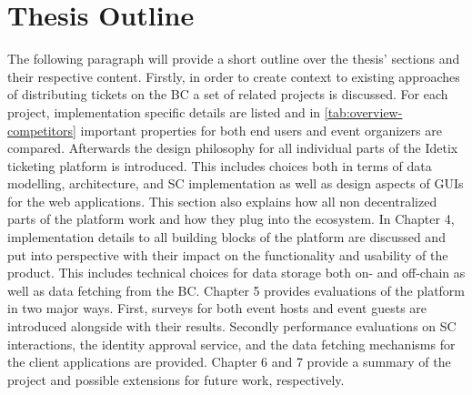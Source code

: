\section{Thesis Outline}

The following paragraph will provide a short outline over the thesis' sections and their respective content. Firstly, in order to create context to existing approaches of distributing tickets on the BC a set of related projects is discussed. For each project, implementation specific details are listed and in \ref{tab:overview-competitors} important properties for both end users and event organizers are compared. Afterwards the design philosophy for all individual parts of the Idetix ticketing platform is introduced. This includes choices both in terms of data modelling, architecture, and SC implementation as well as design aspects of GUIs for the web applications. This section also explains how all non decentralized parts of the platform work and how they plug into the ecosystem. In Chapter 4, implementation details to all building blocks of the platform are discussed and put into perspective with their impact on the functionality and usability of the product. This includes technical choices for data storage both on- and off-chain as well as data fetching from the BC. Chapter 5 provides evaluations of the platform in two major ways. First, surveys for both event hosts and event guests are introduced alongside with their results. Secondly performance evaluations on SC interactions, the identity approval service, and the data fetching mechanisms for the client applications are provided. Chapter 6 and 7 provide a summary of the project and possible extensions for future work, respectively.